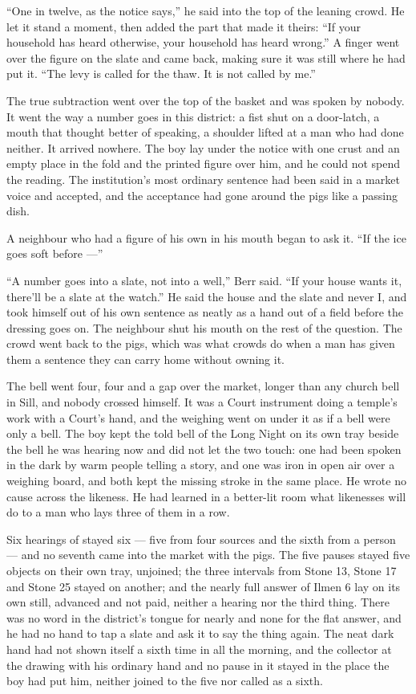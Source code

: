 “One in twelve, as the notice says,” he said into the top of the leaning crowd. He let it stand a moment, then added the part that made it theirs: “If your household has heard otherwise, your household has heard wrong.” A finger went over the figure on the slate and came back, making sure it was still where he had put it. “The levy is called for the thaw. It is not called by me.”

The true subtraction went over the top of the basket and was spoken by nobody. It went the way a number goes in this district: a fist shut on a door-latch, a mouth that thought better of speaking, a shoulder lifted at a man who had done neither. It arrived nowhere. The boy lay under the notice with one crust and an empty place in the fold and the printed figure over him, and he could not spend the reading. The institution's most ordinary sentence had been said in a market voice and accepted, and the acceptance had gone around the pigs like a passing dish.

A neighbour who had a figure of his own in his mouth began to ask it. “If the ice goes soft before ---”

“A number goes into a slate, not into a well,” Berr said. “If your house wants it, there'll be a slate at the watch.” He said the house and the slate and never I, and took himself out of his own sentence as neatly as a hand out of a field before the dressing goes on. The neighbour shut his mouth on the rest of the question. The crowd went back to the pigs, which was what crowds do when a man has given them a sentence they can carry home without owning it.

The bell went four, four and a gap over the market, longer than any church bell in Sill, and nobody crossed himself. It was a Court instrument doing a temple's work with a Court's hand, and the weighing went on under it as if a bell were only a bell. The boy kept the told bell of the Long Night on its own tray beside the bell he was hearing now and did not let the two touch: one had been spoken in the dark by warm people telling a story, and one was iron in open air over a weighing board, and both kept the missing stroke in the same place. He wrote no cause across the likeness. He had learned in a better-lit room what likenesses will do to a man who lays three of them in a row.

\scenebreak

Six hearings of  stayed six --- five from four sources and the sixth from a person --- and no seventh came into the market with the pigs. The five pauses stayed five objects on their own tray, unjoined; the three intervals from Stone 13, Stone 17 and Stone 25 stayed on another; and the nearly full answer of Ilmen 6 lay on its own still, advanced and not paid, neither a hearing nor the third thing. There was no word in the district's tongue for nearly and none for the flat answer, and he had no hand to tap a slate and ask it to say the thing again. The neat dark hand had not shown itself a sixth time in all the morning, and the collector at the drawing with his ordinary hand and no pause in it stayed in the place the boy had put him, neither joined to the five nor called as a sixth.

